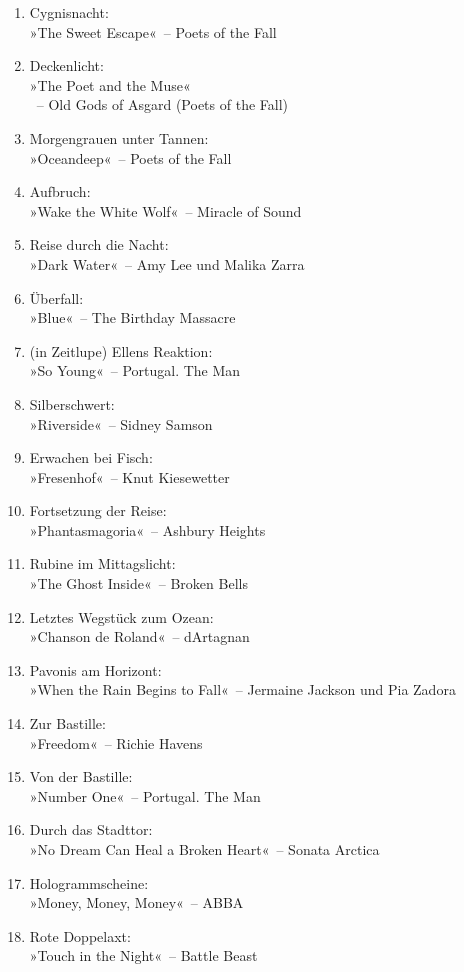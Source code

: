 \begin{enumerate}
    \item Cygnisnacht:\\ »The Sweet Escape«~– Poets of the Fall
    \item Deckenlicht:\\ »The Poet and the Muse«\\~– Old Gods of Asgard (Poets of the Fall)
    \item Morgengrauen unter Tannen:\\ »Oceandeep«~– Poets of the Fall
    \item Aufbruch:\\ »Wake the White Wolf«~– Miracle of Sound
    \item Reise durch die Nacht:\\ »Dark Water«~– Amy Lee und Malika Zarra
    \item Überfall:\\ »Blue«~– The Birthday Massacre
    \item (in Zeitlupe) Ellens Reaktion:\\ »So Young«~– Portugal. The Man
    \item Silberschwert:\\ »Riverside«~– Sidney Samson
    \item Erwachen bei Fisch:\\ »Fresenhof«~– Knut Kiesewetter
    \item Fortsetzung der Reise:\\ »Phantasmagoria«~– Ashbury Heights
    \item Rubine im Mittagslicht:\\ »The Ghost Inside«~– Broken Bells
    \item Letztes Wegstück zum Ozean:\\ »Chanson de Roland«~– dArtagnan
    \item Pavonis am Horizont:\\ »When the Rain Begins to Fall«~– Jermaine Jackson und Pia Zadora
    \item Zur Bastille:\\ »Freedom«~– Richie Havens
    \item Von der Bastille:\\ »Number One«~– Portugal. The Man
    \item Durch das Stadttor:\\ »No Dream Can Heal a Broken Heart«~– Sonata Arctica
    \item Hologrammscheine:\\ »Money, Money, Money«~– ABBA
    \item Rote Doppelaxt:\\ »Touch in the Night«~– Battle Beast

\end{enumerate}
